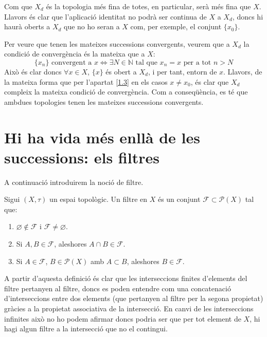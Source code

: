 \documentclass[10pt,a4paper]{article}
\renewcommand{\labelenumi}{\textbf{\thesection.\arabic{enumi}.}}
\begin{document}
\begin{enumerate}
            Com que $X_d$ és la topologia més fina de totes, en particular, serà més fina que $X$. Llavors és clar que l'aplicació identitat no podrà ser continua de $X$ a $X_d$, doncs hi haurà oberts a $X_d$ que no ho seran a $X$ com, per exemple, el conjunt $\{x_0\}$.

            Per veure que tenen les mateixes successions convergents, veurem que a $X_d$ la condició de convergència és la mateixa que a $X$: $$\{x_n\} \text{ convergent a }  x \iff \exists N\in \mathbb N \text{ tal que } x_n=x \text{ per a tot } n>N$$
            Això és clar doncs $\forall x\in X$, $\{x\}$ és obert a $X_d$, i per tant, entorn de $x$. Llavors, de la mateixa forma que per l'apartat \ref{1.3} en els casos $x\neq x_0$, és clar que $X_d$ compleix la mateixa condició de convergència. Com a conseqüència, es té que ambdues topologies tenen les mateixes successions convergents.
\end{enumerate}
\section{Hi ha vida més enllà de les successions: els filtres}
A continuació introduirem la noció de filtre.

Sigui $(X,\tau)$ un espai topològic. Un filtre en $X$ és un conjunt $\mathcal{F}\subset\mathcal{P}(X)$ tal que:
\begin{enumerate}\renewcommand{\labelenumi}{\arabic{enumi}.}
      \item $\varnothing\notin\mathcal{F}$ i $\mathcal{F}\ne\varnothing$.
      \item Si $A,B\in\mathcal{F}$, aleshores $A\cap B\in\mathcal{F}$.
      \item Si $A\in\mathcal{F}$, $B\in\mathcal{P}(X)$ amb $A\subset B$, aleshores $B\in\mathcal{F}$.
\end{enumerate}
A partir d'aquesta definició és clar que les interseccions finites d'elements del filtre pertanyen al filtre, doncs es poden entendre com una concatenació d'interseccions entre dos elements (que pertanyen al filtre per la segona propietat) gràcies a la propietat associativa de la intersecció. En canvi de les interseccions infinites això no ho podem afirmar doncs podria ser que per tot element de $X$, hi hagi algun filtre a la intersecció que no el contingui.
\end{document}
